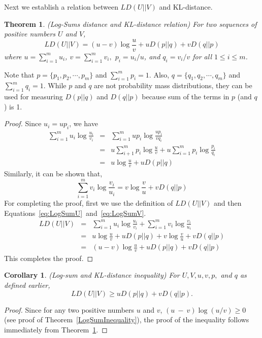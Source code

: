 \documentclass[10pt,myheadings]{IEEEtran}
\newtheorem{theorem}{Theorem}
\newtheorem{corollary}{Corollary}
\begin{document}
\par
Next we establish a relation between $LD(U||V)$ and KL-distance. 
 
\begin{theorem} (\emph{Log-Sums  distance and KL-distance relation})
\label{LogSumAndKL-distRelation}
For two sequences of positive numbers $U$ and $V$, 
\begin{equation}
LD(U||V) = 	(u-v)\log \frac{u}{v}+uD(p||q)+vD(q||p)
\label{eq:logSumDivergence}
\end{equation}
where $u = \sum_{i=1}^m u_i$, $v = \sum_{i=1}^m v_i,$  $p_i = u_i/u$, and $q_i = v_i/v$ for all $1 \leq i \leq m$. 
\end{theorem}
Note that $p = \{p_1, p_2, \cdots, p_m\}$ and $\sum_{i=1}^m p_i = 1$. Also, $q = \{q_1, q_2, \cdots, q_m\}$ and $\sum_{i=1}^m q_i = 1$. 
While $p$ and $q$ are not probability mass distributions, they can be used for measuring $D(p||q)$ and $D(q||p)$ because sum of the terms in $p$ (and $q$) is 1.
\begin{proof} Since $u_i = up_i$, we have
\begin{eqnarray}
\sum_{i=1}^m u_i\log\frac{u_i}{v_i}  &=& \sum_{i=1}^m up_i\log\frac{up_i}{vq_i}\nonumber  \\
&=& u \sum_{i+1}^m p_i\log\frac{u}{v} + u \sum_{i=1}^m p_i\log\frac{p_i}{q_i} \nonumber  \\
&=& u \log\frac{u}{v} + uD(p||q) 
\label{eq:LogSumU}
\end{eqnarray}
Similarly, it can be shown that,
\begin{equation}\sum_{i=1}^m v_i\log\frac{v_i}{u_i}  = v \log\frac{v}{u} + vD(q||p) 
\label{eq:LogSumV}
\end{equation}
For completing  the proof, first we use the definition of $LD(U||V)$ and then Equations~\ref{eq:LogSumU}~and~\ref{eq:LogSumV}.
\begin{eqnarray} 
	LD(U||V) &=& \sum_{i=1}^m u_i\log\frac{u_i}{v_i} + \sum_{i=1}^m v_i\log \frac{v_i}{u_i} \nonumber \\
	&=&u\log\frac{u}{v}+ uD(p||q) +v\log\frac{v}{u} +vD(q||p) \nonumber\\
	&=& (u-v)\log\frac{u}{v} +uD(p||q)+vD(q||p) \nonumber 
\label{eq:Proof}
\end{eqnarray}
This completes the proof.
\end{proof}

\begin{corollary}(\emph{Log-sum and KL-distance inequality})
\label{LogSumAndKL-distInequality}
For $U,V, u, v, p,$ and $q$ as defined earlier,
\begin{equation}
LD(U||V) \geq uD(p||q)+vD(q||p).
\label{eq:logSumDivergence}
\end{equation}
\end{corollary}
\begin{proof}
Since
for any two positive numbers $u$ and $v$, $(u~-~v)\log(u/v) \geq 0$ (see proof of Theorem~\ref{LogSumInequality}),
the proof of the inequality follows immediately from Theorem~\ref{LogSumAndKL-distRelation}.
\end{proof}
\end{document}
